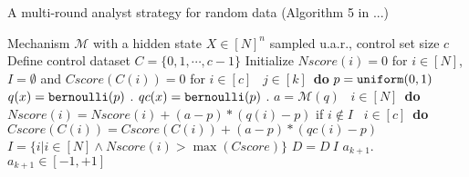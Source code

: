 \documentclass[a4paper,11pt]{article}
\theoremstyle{definition}
\begin{document}
\begin{algorithm}
\footnotesize
\caption{A multi-round analyst strategy for random data (Algorithm 5 in ...)}
\label{alg:BitGOF}
\begin{algorithmic}
\REQUIRE Mechanism $\mathcal{M}$ with a hidden state $X\in [N]^{n}$ sampled u.a.r., control set size $c$
\STATE Define control dataset $C = \{0,1, \cdots, c - 1\}$
\STATE Initialize $Nscore(i) = 0$ for $i \in [N]$, $I = \emptyset$ and $Cscore(C(i)) = 0$ for $i \in [c]$
\ $j\in [k]$\ {\bf do} 
\STATE {} $p=\mathtt{uniform}(0,1)$ 
\STATE {} $q (x) = \mathtt{bernoulli} ( p )$ .
\STATE {} $qc (x) = \mathtt{bernoulli} ( p )$ .
\STATE {} $a = \mathcal{M}(q)$ 
\STATE {}\ $i \in [N]$\ {\bf do}
\STATE \qquad \qquad $Nscore(i) = Nscore(i) + (a - p)*(q (i) - p)$ if $i \notin I$
\STATE {}\ $i \in [c]$\ {\bf do}
\STATE \qquad \qquad $Cscore(C(i)) = Cscore(C(i)) + (a - p)*(qc (i) - p)$
\STATE {} $I = \{i | i\in [N] \land Nscore(i) > \max(Cscore)\}$
\STATE {} $D = D \ I$
\RETURN $a_{k+1}$.
\ENSURE $a_{k+1}\in [-1,+1]$
\end{algorithmic}
\end{algorithm}




\end{document}
